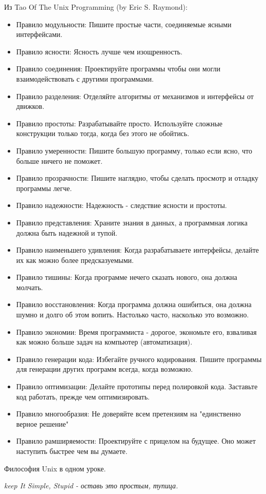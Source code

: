Из Tao Of The Unix Programming (by Eric S. Raymond):
\begin{itemize}
\item Правило модульности: Пишите простые части, соединяемые ясными интерфейсами.
\item Правило ясности: Ясность лучше чем изощренность.
\item Правило соединения: Проектируйте программы чтобы они могли взаимодействовать с другими программами.
\item Правило разделения: Отделяйте алгоритмы от механизмов и интерфейсы от движков.
\item Правило простоты: Разрабатывайте просто. Используйте сложные конструкции только тогда, когда без этого не обойтись.
\item Правило умеренности: Пишите большую программу, только если ясно, что больше ничего не поможет.
\item Правило прозрачности: Пишите наглядно, чтобы сделать просмотр и отладку программы легче.
\item Правило надежности: Надежность - следствие ясности и простоты.
\item Правило представления: Храните знания в данных, а программная логика должна быть надежной и тупой.
\item Правило наименьшего удивления: Когда разрабатываете интерфейсы, делайте их как можно более предсказуемыми.
\item Правило тишины: Когда программе нечего сказать нового, она должна молчать.
\item Правило восстановления: Когда программа должна ошибиться, она должна шумно и долго об этом вопить. Настолько часто, насколько это возможно.
\item Правило экономии: Время программиста - дорогое, экономьте его, взваливая как можно больше задач на компьютер (автоматизация).
\item Правило генерации кода: Избегайте ручного кодирования. Пишите программы для генерации других программ всегда, когда возможно.
\item Правило оптимизации: Делайте прототипы перед полировкой кода. Заставьте код работать, прежде чем оптимизировать.
\item Правило многообразия: Не доверяйте всем претензиям на "единственно верное решение"
\item Правило рамширяемости: Проектируйте с прицелом на будущее. Оно может наступить быстрее чем вы думаете.
\end{itemize}

Философия Unix в одном уроке.

\emph{keep It Simple, Stupid - оставь это простым, тупица.}

